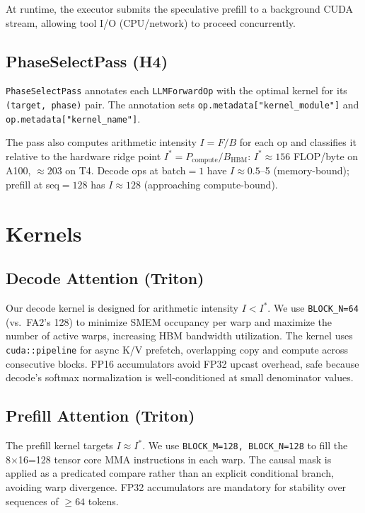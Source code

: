 \documentclass[10pt,twocolumn]{article}
\begin{document}
At runtime, the executor submits the speculative prefill to a background
CUDA stream, allowing tool I/O (CPU/network) to proceed concurrently.

\subsection{PhaseSelectPass (H4)}
\label{sec:phase}

\texttt{PhaseSelectPass} annotates each \texttt{LLMForwardOp} with the
optimal kernel for its \texttt{(target, phase)} pair. The annotation sets
\texttt{op.metadata["kernel\_module"]} and \texttt{op.metadata["kernel\_name"]}.

The pass also computes arithmetic intensity $I = F/B$ for each op and
classifies it relative to the hardware ridge point $I^* = P_{\text{compute}}/B_{\text{HBM}}$:
$I^* \approx 156$ FLOP/byte on A100, $\approx 203$ on T4.
Decode ops at batch$=1$ have $I \approx 0.5$--5 (memory-bound);
prefill at seq$=128$ has $I \approx 128$ (approaching compute-bound).

\section{Kernels}
\label{sec:kernels}

\subsection{Decode Attention (Triton)}

Our decode kernel is designed for arithmetic intensity $I < I^*$.
We use \texttt{BLOCK\_N=64} (vs.\ FA2's 128) to minimize SMEM occupancy per
warp and maximize the number of active warps, increasing HBM bandwidth
utilization. The kernel uses \texttt{cuda::pipeline} for async K/V prefetch,
overlapping copy and compute across consecutive blocks. FP16 accumulators
avoid FP32 upcast overhead, safe because decode's softmax normalization is
well-conditioned at small denominator values.

\subsection{Prefill Attention (Triton)}

The prefill kernel targets $I \approx I^*$. We use \texttt{BLOCK\_M=128,
BLOCK\_N=128} to fill the 8×16=128 tensor core MMA instructions in each warp.
The causal mask is applied as a predicated compare rather than an explicit
conditional branch, avoiding warp divergence. FP32 accumulators are mandatory
for stability over sequences of $\geq 64$ tokens.
\end{document}
